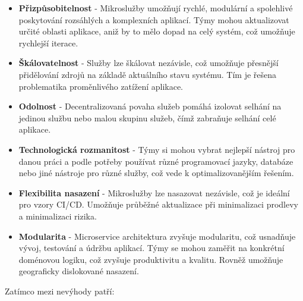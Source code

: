 \begin{itemize}

\item \textbf{Přizpůsobitelnost} - Mikroslužby umožňují rychlé, modulární a spolehlivé poskytování rozsáhlých a komplexních aplikací. Týmy mohou aktualizovat určité oblasti aplikace, aniž by to mělo dopad na celý systém, což umožňuje rychlejší iterace.

\item \textbf{Škálovatelnost} - Služby lze škálovat nezávisle, což umožňuje přesnější přidělování zdrojů na základě aktuálního stavu systému. Tím je řešena problematika proměnlivého zatížení aplikace.

\item \textbf{Odolnost} - Decentralizovaná povaha služeb pomáhá izolovat selhání na jedinou službu nebo malou skupinu služeb, čímž zabraňuje selhání celé aplikace.

\item \textbf{Technologická rozmanitost} - Týmy si mohou vybrat nejlepší nástroj pro danou práci a podle potřeby používat různé programovací jazyky, databáze nebo jiné nástroje pro různé služby, což vede k optimalizovanějším řešením.

\item \textbf{Flexibilita nasazení} - Mikroslužby lze nasazovat nezávisle, což je ideální pro vzory CI/CD. Umožňuje průběžné aktualizace při minimalizaci prodlevy a minimalizaci rizika.

\item \textbf{Modularita} - Microservice architektura zvyšuje modularitu, což usnadňuje vývoj, testování a údržbu aplikací. Týmy se mohou zaměřit na konkrétní doménovou logiku, což zvyšuje produktivitu a kvalitu. Rovněž umožňuje geograficky dislokované nasazení.

\end{itemize}

Zatímco mezi nevýhody patří:

